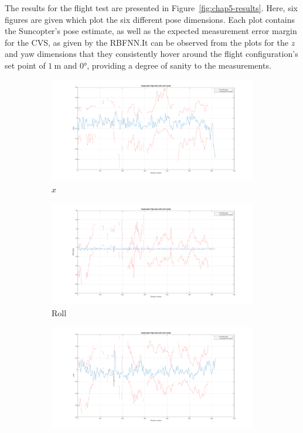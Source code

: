The results for the flight test are presented in Figure~\ref{fig:chap5-results}. Here, six figures are given which plot the six different pose dimensions. Each plot contains the Suncopter's pose estimate, as well as the expected measurement error margin for the CVS, as given by the RBFNN.\@ It can be observed from the plots for the $z$ and yaw dimensions that they consistently hover around the flight configuration's set point of $\SI{1}{\m}$ and $\ang{0}$, providing a degree of sanity to the measurements. 
  
\begin{figure}
  \centering
  \begin{subfigure}{0.45\textwidth}
    \includegraphics[clip, trim = 150 0 120 0, width=\textwidth]{figures/chapter5/x}
    \caption{$x$}
  \end{subfigure}
  \begin{subfigure}{0.45\textwidth}
    \includegraphics[clip, trim = 150 0 120 0, width=\textwidth]{figures/chapter5/roll}
    \caption{Roll}
  \end{subfigure}
  \begin{subfigure}{0.45\textwidth}
    \includegraphics[clip, trim = 150 0 120 0, width=\textwidth]{figures/chapter5/y}

\end{subfigure}
\end{figure}
